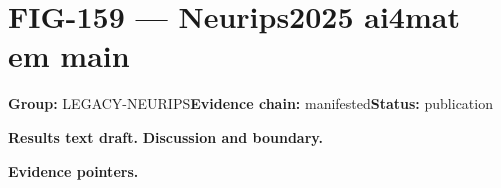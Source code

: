 \clearpage
\section{FIG-159 --- Neurips2025 ai4mat em main}
\label{figpage:fig-159}
\textbf{Group:} LEGACY-NEURIPS\quad \textbf{Evidence chain:} manifested\quad \textbf{Status:} publication

\textbf{Results text draft.} 
\textbf{Discussion and boundary.} 


\textbf{Evidence pointers.}



\vfill
